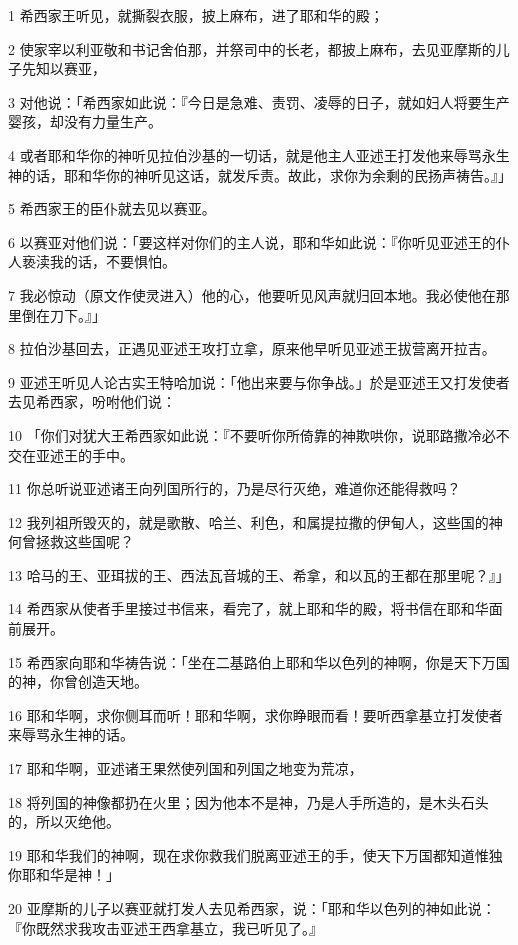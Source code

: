 \par 1 希西家王听见，就撕裂衣服，披上麻布，进了耶和华的殿；
\par 2 使家宰以利亚敬和书记舍伯那，并祭司中的长老，都披上麻布，去见亚摩斯的儿子先知以赛亚，
\par 3 对他说：「希西家如此说：『今日是急难、责罚、凌辱的日子，就如妇人将要生产婴孩，却没有力量生产。
\par 4 或者耶和华你的神听见拉伯沙基的一切话，就是他主人亚述王打发他来辱骂永生神的话，耶和华你的神听见这话，就发斥责。故此，求你为余剩的民扬声祷告。』」
\par 5 希西家王的臣仆就去见以赛亚。
\par 6 以赛亚对他们说：「要这样对你们的主人说，耶和华如此说：『你听见亚述王的仆人亵渎我的话，不要惧怕。
\par 7 我必惊动（原文作使灵进入）他的心，他要听见风声就归回本地。我必使他在那里倒在刀下。』」
\par 8 拉伯沙基回去，正遇见亚述王攻打立拿，原来他早听见亚述王拔营离开拉吉。
\par 9 亚述王听见人论古实王特哈加说：「他出来要与你争战。」於是亚述王又打发使者去见希西家，吩咐他们说：
\par 10 「你们对犹大王希西家如此说：『不要听你所倚靠的神欺哄你，说耶路撒冷必不交在亚述王的手中。
\par 11 你总听说亚述诸王向列国所行的，乃是尽行灭绝，难道你还能得救吗？
\par 12 我列祖所毁灭的，就是歌散、哈兰、利色，和属提拉撒的伊甸人，这些国的神何曾拯救这些国呢？
\par 13 哈马的王、亚珥拔的王、西法瓦音城的王、希拿，和以瓦的王都在那里呢？』」
\par 14 希西家从使者手里接过书信来，看完了，就上耶和华的殿，将书信在耶和华面前展开。
\par 15 希西家向耶和华祷告说：「坐在二基路伯上耶和华以色列的神啊，你是天下万国的神，你曾创造天地。
\par 16 耶和华啊，求你侧耳而听！耶和华啊，求你睁眼而看！要听西拿基立打发使者来辱骂永生神的话。
\par 17 耶和华啊，亚述诸王果然使列国和列国之地变为荒凉，
\par 18 将列国的神像都扔在火里；因为他本不是神，乃是人手所造的，是木头石头的，所以灭绝他。
\par 19 耶和华我们的神啊，现在求你救我们脱离亚述王的手，使天下万国都知道惟独你耶和华是神！」
\par 20 亚摩斯的儿子以赛亚就打发人去见希西家，说：「耶和华以色列的神如此说：『你既然求我攻击亚述王西拿基立，我已听见了。』
